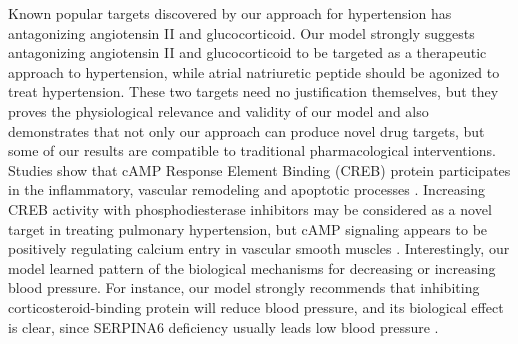     Known popular targets discovered by our approach for hypertension has antagonizing angiotensin II and glucocorticoid. Our model strongly suggests antagonizing angiotensin II and glucocorticoid to be targeted as a therapeutic approach to hypertension, while atrial natriuretic peptide should be agonized to treat hypertension. These two targets need no justification themselves, but they proves the physiological relevance and validity of our model and also demonstrates that not only our approach can produce novel drug targets, but some of our results are compatible to traditional pharmacological interventions. Studies show that cAMP Response Element Binding (CREB) protein participates in the inflammatory, vascular remodeling and apoptotic processes \cite{ichiki2006role}. Increasing CREB activity with phosphodiesterase inhibitors may be considered as a novel target in treating pulmonary hypertension, but cAMP signaling appears to be positively regulating calcium entry in vascular smooth muscles \cite{pulver2004store}. Interestingly, our model learned pattern of the biological mechanisms for decreasing or increasing blood pressure. For instance, our model strongly recommends that inhibiting corticosteroid-binding protein will reduce blood pressure, and its biological effect is clear, since SERPINA6 deficiency usually leads low blood pressure \cite{torpy2001familial}. 
  
